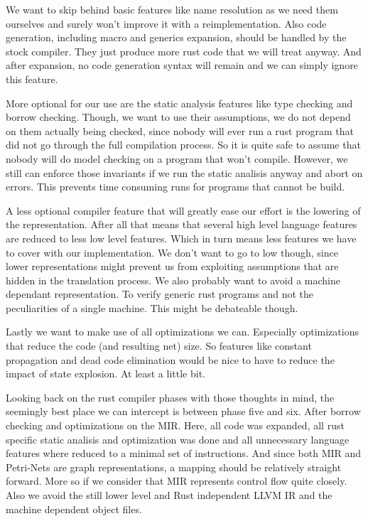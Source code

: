 We want to skip behind basic features like name resolution as we need them ourselves and surely won't improve it with a reimplementation.
Also code generation, including macro and generics expansion, should be handled by the stock compiler.
They just produce more rust code that we will treat anyway.
And after expansion, no code generation syntax will remain and we can simply ignore this feature.

More optional for our use are the static analysis features like type checking and borrow checking.
Though, we want to use their assumptions, we do not depend on them actually being checked, since nobody will ever run a rust program that did not go through the full compilation process.
So it is quite safe to assume that nobody will do model checking on a program that won't compile.
However, we still can enforce those invariants if we run the static analisis anyway and abort on errors.
This prevents time consuming runs for programs that cannot be build.

A less optional compiler feature that will greatly ease our effort is the lowering of the representation.
After all that means that several high level language features are reduced to less low level features.
Which in turn means less features we have to cover with our implementation.
We don't want to go to low though, since lower representations might prevent us from exploiting assumptions that are hidden in the translation process.
We also probably want to avoid a machine dependant representation.
To verify generic rust programs and not the peculiarities of a single machine.
This might be debateable though.

Lastly we want to make use of all optimizations we can.
Especially optimizations that reduce the code (and resulting net) size.
So features like constant propagation and dead code elimination would be nice to have to reduce the impact of state explosion.
At least a little bit.

Looking back on the rust compiler phases with those thoughts in mind, the seemingly best place we can intercept is between phase five and six.
After borrow checking and optimizations on the MIR.
Here, all code was expanded, all rust specific static analisis and optimization was done and all unnecessary language features where reduced to a minimal set of instructions.
And since both MIR and Petri-Nets are graph representations, a mapping should be relatively straight forward.
More so if we consider that MIR represents control flow quite closely.
Also we avoid the still lower level and Rust independent LLVM IR and the machine dependent object files. 

